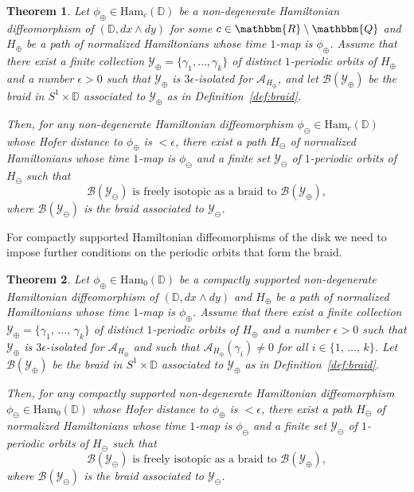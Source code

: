 \documentclass[AHL,Unicode,longabstracts,published]{cedram}
\newcommand{\Q}{\mathbbm{Q}}
\newcommand{\R}{\mathbbm{R}}
\newcommand{\D}{\mathbb{D}}
\newcommand{\Ham}{\mathrm{Ham}}
\newcommand{\clY}{\mathcal{Y}}
\newcommand{\clA}{\mathcal{A}}
\newcommand{\clB}{\mathcal{B}}
\newtheorem{theol}{Theorem}
\begin{document}
\begin{theol} \label{thm:disk}
Let $\phi_\oplus \in \Ham_c(\D)$ be a non-degenerate Hamiltonian diffeomorphism of $(\D,dx \wedge dy)$ for some $c\in \R \setminus \Q$ and $H_\oplus$ be a path of normalized Hamiltonians whose time $1$-map is $\phi_\oplus$. Assume that there exist a finite collection $\clY_\oplus=\{\gamma_1,\ldots,\gamma_k\}$ of distinct $1$-periodic orbits of $H_\oplus$ and a number $\epsilon>0$ such that $\clY_\oplus$ is $3\epsilon$-isolated for $\clA_{H_\oplus}$, and let $\clB(\clY_\oplus)$ be the braid in $S^1 \times \D $ associated to $\clY_\oplus$ as in Definition~\ref{def:braid}.

Then, for any non-degenerate Hamiltonian diffeomorphism $\phi_\ominus\in \Ham_c(\D)$ whose Hofer distance to $\phi_\oplus$ is $< \epsilon$, there exist a path $H_\ominus$ of normalized Hamiltonians whose time $1$-map is $\phi_\ominus$ and a finite set $\clY_\ominus$ of $1$-periodic orbits of $H_\ominus$ such that
\[
\clB(\clY_\ominus) \text{ is freely isotopic as a braid to } \clB(\clY_\oplus),
\]
where $\clB(\clY_\ominus)$ is the braid associated to $\clY_\ominus$.
\end{theol}

For compactly supported Hamiltonian diffeomorphisms of the disk we need to impose further conditions on the periodic orbits that form the braid.

\begin{theol}\label{thm:disk0}
Let $\phi_\oplus \in \Ham_0(\D)$ be a compactly supported non-degenerate Hamiltonian diffeomorphism of $(\D,dx \wedge dy)$ and $H_\oplus$ be a path of normalized Hamiltonians whose time $1$-map is $\phi_\oplus$. Assume that there exist a finite collection $\clY_\oplus=\{\gamma_1,\,\ldots,\,\gamma_k\}$ of distinct $1$-periodic orbits of $H_\oplus$ and a number $\epsilon>0$ such that $\clY_\oplus$ is $3\epsilon$-isolated for $\clA_{H_\oplus}$ and such that $\clA_{H_\oplus}(\gamma_i) \neq 0$ for all $i \in \{1,\,\ldots,\,k\}$. Let $\clB(\clY_\oplus)$ be the braid in $S^1 \times \D$ associated to $\clY_\oplus$ as in Definition~\ref{def:braid}.

Then, for any compactly supported non-degenerate Hamiltonian diffeomorphism $\phi_\ominus\in \Ham_0(\D)$ whose Hofer distance to $\phi_\oplus$ is $< \epsilon$, there exist a path $H_\ominus$ of normalized Hamiltonians whose time $1$-map is $\phi_\ominus$ and a finite set $\clY_\ominus$ of $1$-periodic orbits of $H_\ominus$ such that
\[
\clB(\clY_\ominus) \text{ is freely isotopic as a braid to } \clB(\clY_\oplus),
\]
where $\clB(\clY_\ominus)$ is the braid associated to $\clY_\ominus$.
\end{theol}
\end{document}
